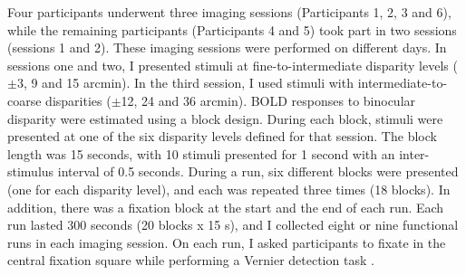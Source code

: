 Four participants underwent three imaging sessions (Participants 1, 2, 3 and 6), while the remaining participants (Participants 4 and 5) took part in two sessions (sessions 1 and 2). These imaging sessions were performed on different days. In sessions one and two, I presented stimuli at fine-to-intermediate disparity levels ($\pm$3, 9 and 15 arcmin). In the third session, I used stimuli with intermediate-to-coarse disparities ($\pm$12, 24 and 36 arcmin). 
BOLD responses to binocular disparity were estimated using a block design. During each block, stimuli were presented at one of the six disparity levels defined for that session. The block length was 15 seconds, with 10 stimuli presented for 1 second with an inter-stimulus interval of 0.5 seconds. During a run, six different blocks were presented (one for each disparity level), and each was repeated three times (18 blocks). In addition, there was a fixation block at the start and the end of each run. Each run lasted 300 seconds (20 blocks x 15 s), and I collected eight or nine functional runs in each imaging session. On each run, I asked participants to fixate in the central fixation square while performing a Vernier detection task \cite{Preston:2008dg}. 

